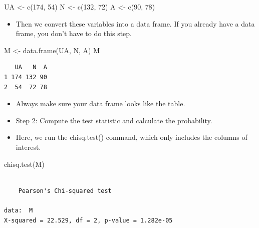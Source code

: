 \documentclass[
  letterpaper,
  DIV=11,
  numbers=noendperiod]{scrreprt}
\newenvironment{Shaded}{\begin{snugshade}}{\end{snugshade}}
\newcommand{\DecValTok}[1]{\textcolor[rgb]{0.68,0.00,0.00}{#1}}
\newcommand{\FunctionTok}[1]{\textcolor[rgb]{0.28,0.35,0.67}{#1}}
\newcommand{\NormalTok}[1]{\textcolor[rgb]{0.00,0.23,0.31}{#1}}
\newcommand{\OtherTok}[1]{\textcolor[rgb]{0.00,0.23,0.31}{#1}}
\providecommand{\tightlist}{%
  \setlength{\itemsep}{0pt}\setlength{\parskip}{0pt}}\usepackage{longtable,booktabs,array}
\begin{document}
\begin{Shaded}
\begin{Highlighting}[]
\NormalTok{UA }\OtherTok{\textless{}{-}} \FunctionTok{c}\NormalTok{(}\DecValTok{174}\NormalTok{, }\DecValTok{54}\NormalTok{)}
\NormalTok{N }\OtherTok{\textless{}{-}} \FunctionTok{c}\NormalTok{(}\DecValTok{132}\NormalTok{, }\DecValTok{72}\NormalTok{)}
\NormalTok{A }\OtherTok{\textless{}{-}} \FunctionTok{c}\NormalTok{(}\DecValTok{90}\NormalTok{, }\DecValTok{78}\NormalTok{)}
\end{Highlighting}
\end{Shaded}

\begin{itemize}
\tightlist
\item
  Then we convert these variables into a data frame. If you already have
  a data frame, you don't have to do this step.
\end{itemize}

\begin{Shaded}
\begin{Highlighting}[]
\NormalTok{M }\OtherTok{\textless{}{-}} \FunctionTok{data.frame}\NormalTok{(UA, N, A)}
\NormalTok{M}
\end{Highlighting}
\end{Shaded}

\begin{verbatim}
   UA   N  A
1 174 132 90
2  54  72 78
\end{verbatim}

\begin{itemize}
\item
  Always make sure your data frame looks like the table.
\item
  Step 2: Compute the test statistic and calculate the probability.
\item
  Here, we run the chisq.test() command, which only includes the columns
  of interest.
\end{itemize}

\begin{Shaded}
\begin{Highlighting}[]
\FunctionTok{chisq.test}\NormalTok{(M)}
\end{Highlighting}
\end{Shaded}

\begin{verbatim}

    Pearson's Chi-squared test

data:  M
X-squared = 22.529, df = 2, p-value = 1.282e-05
\end{verbatim}
\end{document}
